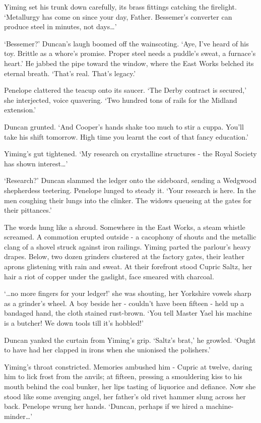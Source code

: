 Yiming set his trunk down carefully, its brass fittings catching the firelight. `Metallurgy has come on since your day, Father. Bessemer's converter can produce steel in minutes, not days\dots'

`Bessemer?' Duncan's laugh boomed off the wainscoting. `Aye, I've heard of his toy. Brittle as a whore's promise. Proper steel needs a puddle's sweat, a furnace's heart.' He jabbed the pipe toward the window, where the East Works belched its eternal breath. `That's real. That's legacy.'

Penelope clattered the teacup onto its saucer. `The Derby contract is secured,' she interjected, voice quavering. `Two hundred tons of rails for the Midland extension.'

Duncan grunted. `And Cooper's hands shake too much to stir a cuppa. You'll take his shift tomorrow. High time you learnt the cost of that fancy education.'

Yiming's gut tightened. `My research on crystalline structures - the Royal Society has shown interest\dots'

`Research?' Duncan slammed the ledger onto the sideboard, sending a Wedgwood shepherdess teetering. Penelope lunged to steady it. `Your research is here. In the men coughing their lungs into the clinker. The widows queueing at the gates for their pittances.'

The words hung like a shroud. Somewhere in the East Works, a steam whistle screamed.
A commotion erupted outside - a cacophony of shouts and the metallic clang of a shovel struck against iron railings. Yiming parted the parlour's heavy drapes. Below, two dozen grinders clustered at the factory gates, their leather aprons glistening with rain and sweat. At their forefront stood Cupric Saltz, her hair a riot of copper under the gaslight, face smeared with charcoal.

`\dots no more fingers for your ledger!' she was shouting, her Yorkshire vowels sharp as a grinder's wheel. A boy beside her - couldn't have been fifteen - held up a bandaged hand, the cloth stained rust-brown. `You tell Master Yael his machine is a butcher! We down tools till it's hobbled!'

Duncan yanked the curtain from Yiming's grip. `Saltz's brat,' he growled. `Ought to have had her clapped in irons when she unionised the polishers.'

Yiming's throat constricted. Memories ambushed him - Cupric at twelve, daring him to lick frost from the anvils; at fifteen, pressing a smouldering kiss to his mouth behind the coal bunker, her lips tasting of liquorice and defiance. Now she stood like some avenging angel, her father's old rivet hammer slung across her back.
Penelope wrung her hands. `Duncan, perhaps if we hired a machine-minder\dots'

